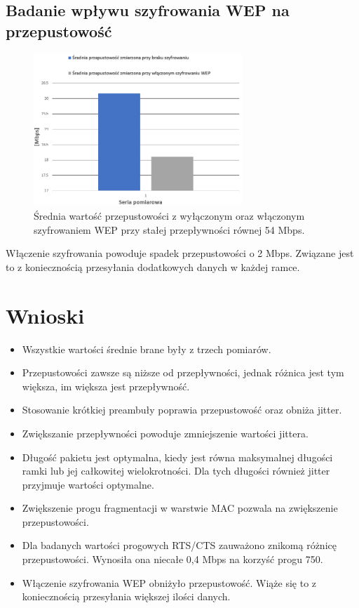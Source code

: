 \documentclass[12pt, a4paper, oneside]{article}
\begin{document}
\subsection{Badanie wpływu szyfrowania WEP na przepustowość}
\begin{figure}[h!]
\centering
\includegraphics[width=0.7\textwidth]{pics/f11.png}
\caption{Średnia wartość przepustowości z wyłączonym oraz włączonym szyfrowaniem WEP przy stałej przepływności równej 54 Mbps.}
\end{figure}
\indent Włączenie szyfrowania powoduje spadek przepustowości o 2 Mbps. Związane jest to z koniecznością przesyłania dodatkowych danych w każdej ramce.
\section{Wnioski}
\begin{itemize}
\item Wszystkie wartości średnie brane były z trzech pomiarów.
\item Przepustowości zawsze są niższe od przepływności, jednak różnica jest tym większa, im większa jest przepływność.
\item Stosowanie krótkiej preambuły poprawia przepustowość oraz obniża jitter.
\item Zwiększanie przepływności powoduje zmniejszenie wartości jittera.
\item Długość pakietu jest optymalna, kiedy jest równa maksymalnej długości ramki lub jej całkowitej wielokrotności. Dla tych długości również jitter przyjmuje wartości optymalne.
\item Zwiększenie progu fragmentacji w warstwie MAC pozwala na zwiększenie przepustowości.
\item Dla badanych wartości progowych RTS/CTS zauważono znikomą różnicę przepustowości. Wynosiła ona niecałe 0,4 Mbps na korzyść progu 750.
\item Włączenie szyfrowania WEP obniżyło przepustowość. Wiąże się to z koniecznością przesyłania większej ilości danych.
\end{itemize}
\end{document}
